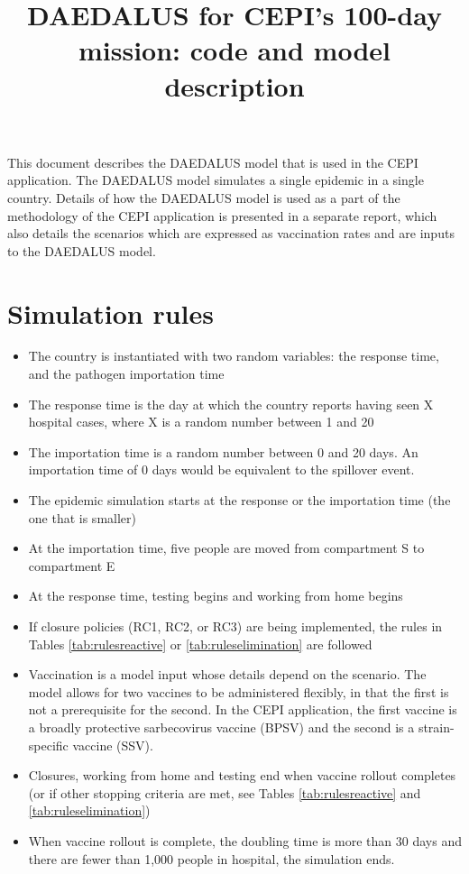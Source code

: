 \documentclass[
]{article}
\title{DAEDALUS for CEPI's 100-day mission: code and model description}
\author{}
\date{\vspace{-2.5em}}
\providecommand{\tightlist}{%
  \setlength{\itemsep}{0pt}\setlength{\parskip}{0pt}}
\begin{document}
\maketitle

This document describes the DAEDALUS model that is used in the CEPI application. The DAEDALUS model simulates a single epidemic in a single country. Details of how the DAEDALUS model is used as a part of the methodology of the CEPI application is presented in a separate report, which also details the scenarios which are expressed as vaccination rates and are inputs to the DAEDALUS model.

\section{Simulation rules}\label{simulation-rules}

\begin{itemize}
\tightlist
\item
  The country is instantiated with two random variables: the response time, and the pathogen importation time
\item
  The response time is the day at which the country reports having seen X hospital cases, where X is a random number between 1 and 20
\item
  The importation time is a random number between 0 and 20 days. An importation time of 0 days would be equivalent to the spillover event.
\item
  The epidemic simulation starts at the response or the importation time (the one that is smaller)
\item
  At the importation time, five people are moved from compartment S to compartment E
\item
  At the response time, testing begins and working from home begins
\item
  If closure policies (RC1, RC2, or RC3) are being implemented, the rules in Tables \ref{tab:rulesreactive} or \ref{tab:ruleselimination} are followed
\item
  Vaccination is a model input whose details depend on the scenario. The model allows for two vaccines to be administered flexibly, in that the first is not a prerequisite for the second. In the CEPI application, the first vaccine is a broadly protective sarbecovirus vaccine (BPSV) and the second is a strain-specific vaccine (SSV).
\item
  Closures, working from home and testing end when vaccine rollout completes (or if other stopping criteria are met, see Tables \ref{tab:rulesreactive} and \ref{tab:ruleselimination})
\item
  When vaccine rollout is complete, the doubling time is more than 30 days and there are fewer than 1,000 people in hospital, the simulation ends.
\end{itemize}
\end{document}
